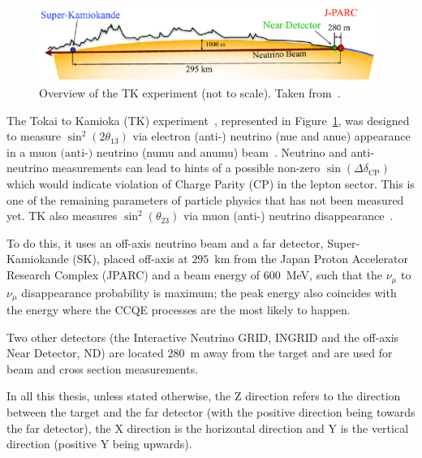 
\begin{figure}[ht]
  \center
  \includegraphics[width=0.98\textwidth]{images/t2k/journey_of_T2K_Neutrino-5.eps}
  \caption[Overview of the T2K experiment]{Overview of the
    \Gls{TK} experiment (not to scale). Taken from~\cite{T2K2011}.}
  \label{fig:t2k}
\end{figure}

The Tokai to Kamioka (\Gls{TK}) experiment~\cite{T2K2011}, represented
in Figure~\ref{fig:t2k}, was designed to measure
$\sin^2(2\theta_{13})$ via electron (anti-) neutrino (\gls{nue} and
\gls{anue}) appearance in a muon $\mbox{(anti-)}$ neutrino (\gls{numu}
and \gls{anumu}) beam~\cite{T2K2011}. Neutrino and anti-neutrino
measurements can lead to hints of a possible non-zero
$\sin(\Delta \delta_{\text{CP}})$ which would indicate violation of
Charge Parity (\Gls{CP}) in the lepton sector. This is one of the
remaining parameters of particle physics that has not been measured
yet. \Gls{TK} also measures $\sin^2(\theta_{23})$ via muon (anti-)
neutrino disappearance~\cite{Abe:2017vif}.

To do this, it uses an off-axis neutrino beam and a far detector,
Super-Kamiokande (\Gls{SK}), placed off-axis at $295$~km from the
Japan Proton Accelerator Research Complex (\Gls{JPARC}) and a beam
energy of $600$~MeV, such that the $\nu_\mu$ to $\nu_\mu$
disappearance probability is maximum; the peak energy also coincides
with the energy where the \Gls{CCQE} processes are the most likely to
happen.

Two other detectors (the Interactive Neutrino GRID, \Gls{INGRID} and
the off-axis Near Detector, \Gls{ND}) are located $280$~m away from
the target and are used for beam and cross section measurements.

In all this thesis, unless stated otherwise, the Z direction refers to
the direction between the target and the far detector (with the
positive direction being towards the far detector), the X direction is
the horizontal direction and Y is the vertical direction (positive Y
being upwards).

